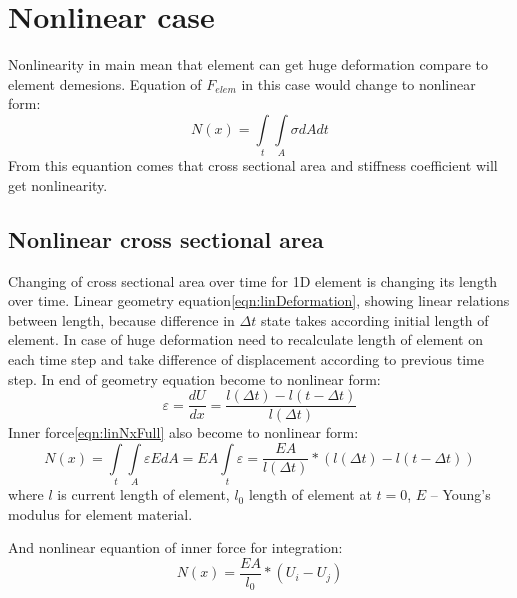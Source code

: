 \documentclass[12pt]{report}
\begin{document}
\section{Nonlinear case}
Nonlinearity in main mean that element can get huge deformation compare to
element demesions. Equation of $F_{elem}$ in this case  would change to
nonlinear form:
\begin{equation}\label{eqn:nonlinNx}
  N(x)= \int\limits_t\int\limits_A \sigma dAdt
\end{equation}
From this equantion comes that cross sectional area and stiffness coefficient
will get nonlinearity. \par \subsection{Nonlinear cross sectional area}\par
Changing of cross sectional area over time for 1D element is changing its length
over time. Linear geometry equation\eqref{eqn:linDeformation}, showing linear
relations between length, because difference in $\Delta t$ state takes according
initial length of element. In case of huge deformation need to recalculate
length of element on each time step and take difference of displacement
according to previous time step. In end of geometry equation become to nonlinear
form:
\begin{equation}\label{eqn:nonlinDeformation}
  \varepsilon=\frac{dU}{dx}=\frac{l(\Delta t)-l(t-\Delta t)}{l(\Delta t)}
\end{equation}
Inner force\eqref{eqn:linNxFull} also become to nonlinear form:
\begin{equation}\label{eqn:nonlinNxFull}
  N(x)= \int\limits_t\int\limits_A \varepsilon EdA=EA\int\limits_t\varepsilon=\frac{EA}{l(\Delta t)}*(l(\Delta t)-l(t-\Delta t))
\end{equation}
where $l$ is current length of element, $l_0$ length of element at $t=0$, $E$ –
Young’s modulus for element material.\par
And nonlinear equantion of inner force for integration:
\begin{equation}\label{eqn:nonlinNxWdispl}
  N(x)=\frac{EA}{l_0}*(U_{i}-U_{j})
\end{equation}\par
\end{document}
